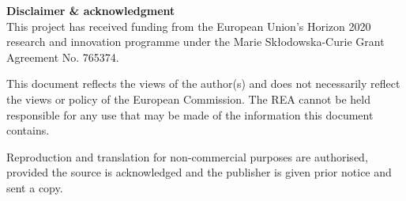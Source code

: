 \documentclass{ROMSOC}
\begin{document}
{\small
\textbf{Disclaimer \& acknowledgment}\\
This project has received funding from the European Union’s Horizon 2020 research and innovation programme under the Marie Sk\l odowska-Curie Grant Agreement No. 765374. 

This document reflects the views of the author(s) and does not necessarily reflect the views or policy of the European Commission. The REA cannot be held responsible for any use that may be made of the information this document contains.

Reproduction and translation for non-commercial purposes are authorised, provided the source is acknowledged and the publisher is given prior notice and sent a copy. 
}
\clearpage


\setcounter{tocdepth}{2}

\tableofcontents

\newpage

\lofoot[\footerlogo \hspace{10pt} \footertext]{\footerlogo \hspace{10pt} \footertext}
\lefoot[\footerlogo \hspace{10pt} \footertext]{\footerlogo \hspace{10pt} \footertext}

\rofoot[\pagemark]{\pagemark}

\rohead{\rightmark}
\rehead{\rightmark}

\setcounter{page}{1}
\pagestyle{scrheadings}

\hypersetup{pageanchor=true}


%


\label{finalpg}
\clearpage
\end{document}

